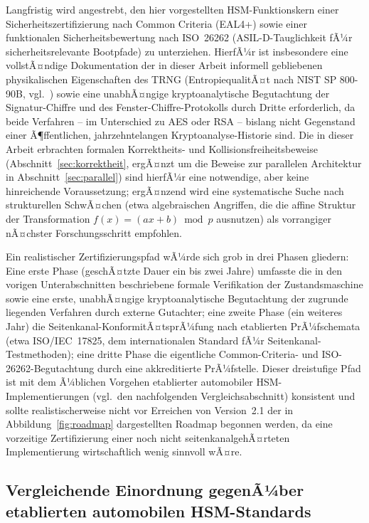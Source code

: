 ﻿\documentclass[a4paper,12pt]{article}
\theoremstyle{definition}
\begin{document}
Langfristig wird angestrebt, den hier vorgestellten HSM-Funktionskern einer Sicherheitszertifizierung nach Common Criteria (EAL4+) sowie einer funktionalen Sicherheitsbewertung nach ISO~26262 (ASIL-D-Tauglichkeit fÃ¼r sicherheitsrelevante Bootpfade) zu unterziehen. HierfÃ¼r ist insbesondere eine vollstÃ¤ndige Dokumentation der in dieser Arbeit informell gebliebenen physikalischen Eigenschaften des TRNG (EntropiequalitÃ¤t nach NIST SP 800-90B, vgl.\ \cite{NIST90B}) sowie eine unabhÃ¤ngige kryptoanalytische Begutachtung der Signatur-Chiffre und des Fenster-Chiffre-Protokolls durch Dritte erforderlich, da beide Verfahren -- im Unterschied zu AES oder RSA -- bislang nicht Gegenstand einer Ã¶ffentlichen, jahrzehntelangen Kryptoanalyse-Historie sind. Die in dieser Arbeit erbrachten formalen Korrektheits- und Kollisionsfreiheitsbeweise (Abschnitt~\ref{sec:korrektheit}, ergÃ¤nzt um die Beweise zur parallelen Architektur in Abschnitt~\ref{sec:parallel}) sind hierfÃ¼r eine notwendige, aber keine hinreichende Voraussetzung; ergÃ¤nzend wird eine systematische Suche nach strukturellen SchwÃ¤chen (etwa algebraischen Angriffen, die die affine Struktur der Transformation $f(x)=(ax+b)\bmod p$ ausnutzen) als vorrangiger nÃ¤chster Forschungsschritt empfohlen.

Ein realistischer Zertifizierungspfad wÃ¼rde sich grob in drei Phasen gliedern: Eine erste Phase (geschÃ¤tzte Dauer ein bis zwei Jahre) umfasste die in den vorigen Unterabschnitten beschriebene formale Verifikation der Zustandsmaschine sowie eine erste, unabhÃ¤ngige kryptoanalytische Begutachtung der zugrunde liegenden Verfahren durch externe Gutachter; eine zweite Phase (ein weiteres Jahr) die Seitenkanal-KonformitÃ¤tsprÃ¼fung nach etablierten PrÃ¼fschemata (etwa ISO/IEC~17825, dem internationalen Standard fÃ¼r Seitenkanal-Testmethoden); eine dritte Phase die eigentliche Common-Criteria- und ISO-26262-Begutachtung durch eine akkreditierte PrÃ¼fstelle. Dieser dreistufige Pfad ist mit dem Ã¼blichen Vorgehen etablierter automobiler HSM-Implementierungen (vgl.\ den nachfolgenden Vergleichsabschnitt) konsistent und sollte realistischerweise nicht vor Erreichen von Version~2.1 der in Abbildung~\ref{fig:roadmap} dargestellten Roadmap begonnen werden, da eine vorzeitige Zertifizierung einer noch nicht seitenkanalgehÃ¤rteten Implementierung wirtschaftlich wenig sinnvoll wÃ¤re.

\subsection{Vergleichende Einordnung gegenÃ¼ber etablierten automobilen HSM-Standards}
\label{sec:ausblick-vergleich}
\end{document}
